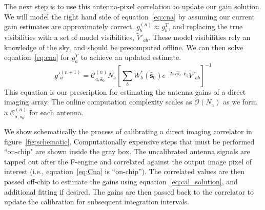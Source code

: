 \documentclass[a4paper,fleqn,usenatbib]{../mnras}
\newcommand{\Nant}{\ensuremath{N_{\mathrm{a}}}}
\newcommand{\spix}{\ensuremath{\hat{\mathbf{s}}_{0}}}
\newcommand{\Cna}[1][n]{\ensuremath{\mathcal{C}^{(#1)}_{a,\spix}}}
\newcommand{\rb}{\ensuremath{\mathbf{r}_b}}
\newcommand{\beamtheta}{\ensuremath{W}}
\newcommand{\V}{\ensuremath{\widetilde{V}}}
\begin{document}
The next step is to use this antenna-pixel correlation to update our gain solution. We will model the right hand side of equation~\ref{eq:cna} by assuming our current gain estimates are approximately correct, $g^{(n)}_b\approx g^T_b$, and replacing the true visibilities with a set of model visibilities, $\V'_{ab}$. These model visibilities rely an knowledge of the sky, and should be precomputed offline. We can then solve equation~\ref{eq:cna} for $g^T_a$ to achieve an updated estimate.
\begin{equation}\label{eq:cal_solution}
g'^{(n+1)}_a = \Cna \Nant \left[ \sum_b \beamtheta^*_b(\spix) e^{-2\pi i \spix \cdot \rb} \V'_{ab} \right]^{-1}
\end{equation}
This equation is our prescription for estimating the antenna gains of a direct imaging array. The online computation complexity scales as $\mathcal{O}(\Nant)$ as we form a $\Cna$ for each antenna. 

We show schematically the process of calibrating a direct imaging correlator in figure~\ref{fig:schematic}. Computationally expensive steps that must be performed ``on-chip" are shown inside the gray box. The uncalibrated antenna signals are tapped out after the F-engine and correlated against the output image pixel of interest (i.e., equation~\ref{eq:Cna} is ``on-chip''). The correlated values are then passed off-chip to estimate the gains using equation~\ref{eq:cal_solution}, and additional fitting if desired. The gains are then passed back to the correlator to update the calibration for subsequent integration intervals. 
\end{document}
